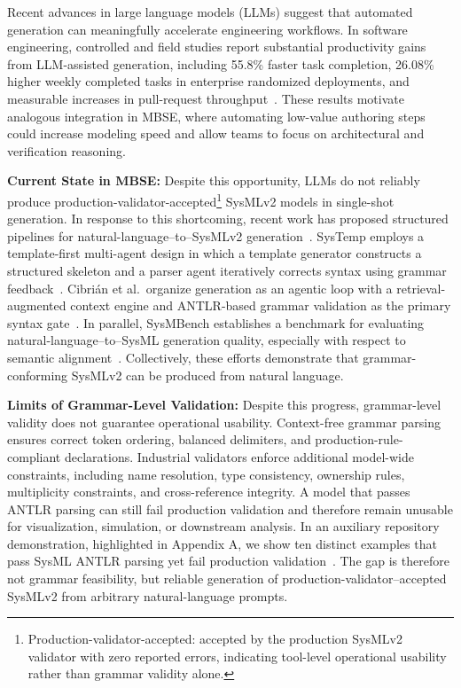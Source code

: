 \documentclass[colorlinks,upint,subscriptcorrection,varvw,hyphenate,balance]{asmeconf} %
\begin{document}
Recent advances in large language models (LLMs) suggest that automated generation can meaningfully accelerate engineering workflows. In software engineering, controlled and field studies report substantial productivity gains from LLM-assisted generation, including 55.8\% faster task completion, 26.08\% higher weekly completed tasks in enterprise randomized deployments, and measurable increases in pull-request throughput~\cite{peng2023copilot,cui2025highSkilled,demirer2024fieldCopilot}. These results motivate analogous integration in MBSE, where automating low-value authoring steps could increase modeling speed and allow teams to focus on architectural and verification reasoning. 

\textbf{Current State in MBSE:} Despite this opportunity, LLMs do not reliably produce production-validator-accepted\footnote{Production-validator-accepted: accepted by the production SysMLv2 validator with zero reported errors, indicating tool-level operational usability rather than grammar validity alone.} SysMLv2 models in single-shot generation. In response to this shortcoming, recent work has proposed structured pipelines for natural-language--to--SysMLv2 generation~\cite{bouamra2025systemp,cibrian2025sysmlagent}. SysTemp employs a template-first multi-agent design in which a template generator constructs a structured skeleton and a parser agent iteratively corrects syntax using grammar feedback~\cite{bouamra2025systemp}. Cibrián et al.\ organize generation as an agentic loop with a retrieval-augmented context engine and ANTLR-based grammar validation as the primary syntax gate~\cite{cibrian2025sysmlagent}. In parallel, SysMBench establishes a benchmark for evaluating natural-language--to--SysML generation quality, especially with respect to semantic alignment~\cite{jin2025sysmbench}. Collectively, these efforts demonstrate that grammar-conforming SysMLv2 can be produced from natural language.

\textbf{Limits of Grammar-Level Validation:} Despite this progress, grammar-level validity does not guarantee operational usability. Context-free grammar parsing ensures correct token ordering, balanced delimiters, and production-rule-compliant declarations. Industrial validators enforce additional model-wide constraints, including name resolution, type consistency, ownership rules, multiplicity constraints, and cross-reference integrity. A model that passes ANTLR parsing can still fail production validation and therefore remain unusable for visualization, simulation, or downstream analysis. In an auxiliary repository demonstration, highlighted in Appendix A, we show ten distinct examples that pass SysML ANTLR parsing yet fail production validation~\cite{sysmbenchCompilerLoopRepo2026}. The gap is therefore not grammar feasibility, but reliable generation of production-validator--accepted SysMLv2 from arbitrary natural-language prompts.
\end{document}
